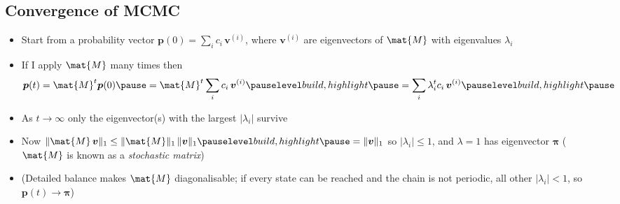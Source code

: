 \begin{slide}
\section[-2]{Convergence of MCMC}

\begin{PauseHighLight}
  \begin{itemize}
  \item Start from a probability vector $\bm{p}(0) = \sum_{i} c_i\,\bm{v}^{(i)}$,
    where $\bm{v}^{(i)}$ are eigenvectors of $\mat{M}$ with
    eigenvalues $\lambda_i$\pause
  \item If I apply $\mat{M}$ many times then
    \begin{align*}
      \bm{p}(t) = \mat{M}^t \bm{p}(0)\pause
      =  \mat{M}^t \sum_{i} c_i\,\bm{v}^{(i)}\pauseb
      = \sum_{i} \lambda_i^{t} c_i\,\bm{v}^{(i)}\pauseb
    \end{align*}
  \item As $t\rightarrow\infty$ only the eigenvector(s) with the largest
    $|\lambda_i|$ survive\pause
  \item Now $\|\mat{M}\,\bm{v}\|_1 \leq \|\mat{M}\|_1\,\|\bm{v}\|_1\pauseb =
    \|\bm{v}\|_1$\pauseb{} so $|\lambda_i|\le1$\pauseb{}, and
    $\lambda=1$ has eigenvector $\bm{\pi}$\pauseb{} ($\mat{M}$ is known as a
    \emph{stochastic matrix})\pauseb
  \item[] {\footnotesize (Detailed balance makes $\mat{M}$ diagonalisable; if
      every state can be reached and the chain is not periodic, all
      other $|\lambda_i|<1$, so $\bm{p}(t)\to\bm{\pi}$)}\pauseb
  \end{itemize}
\end{PauseHighLight}

\end{slide}


